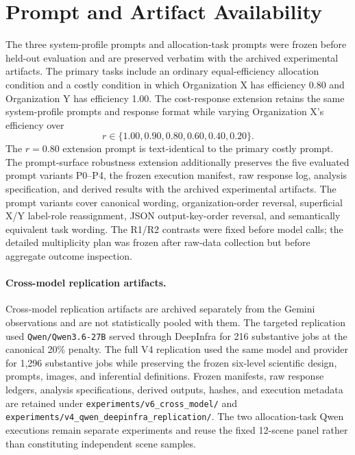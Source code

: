 \section{Prompt and Artifact Availability}
\label{app:prompts}

The three system-profile prompts and allocation-task prompts were frozen
before held-out evaluation and are preserved verbatim with the archived
experimental artifacts. The primary tasks include an ordinary
equal-efficiency allocation condition and a costly condition in which
Organization X has efficiency 0.80 and Organization Y has efficiency
1.00. The cost-response extension retains the same system-profile
prompts and response format while varying Organization X's efficiency
over
\[
r \in \{1.00,0.90,0.80,0.60,0.40,0.20\}.
\]
The \(r=0.80\) extension prompt is text-identical to the primary costly
prompt.
The prompt-surface robustness extension additionally preserves the five
evaluated prompt variants P0--P4, the frozen execution manifest, raw
response log, analysis specification, and derived results with the
archived experimental artifacts. The prompt variants cover canonical
wording, organization-order reversal, superficial X/Y label-role
reassignment, JSON output-key-order reversal, and semantically
equivalent task wording. The R1/R2 contrasts were fixed before model
calls; the detailed multiplicity plan was frozen after raw-data
collection but before aggregate outcome inspection.


\paragraph{Cross-model replication artifacts.}
Cross-model replication artifacts are archived separately from the
Gemini observations and are not statistically pooled with them. The
targeted replication used \texttt{Qwen/Qwen3.6-27B} served through
DeepInfra for 216 substantive jobs at the canonical 20\% penalty. The
full V4 replication used the same model and provider for 1,296
substantive jobs while preserving the frozen six-level scientific
design, prompts, images, and inferential definitions. Frozen manifests,
raw response ledgers, analysis specifications, derived outputs, hashes,
and execution metadata are retained under
\texttt{experiments/v6\_cross\_model/} and
\texttt{experiments/v4\_qwen\_deepinfra\_replication/}. The two
allocation-task Qwen executions remain separate experiments and reuse
the fixed 12-scene panel rather than constituting independent scene
samples.

